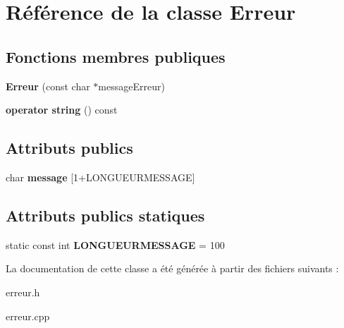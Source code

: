 \hypertarget{class_erreur}{\section{Référence de la classe Erreur}
\label{class_erreur}
}
\subsection*{Fonctions membres publiques}
\begin{DoxyCompactItemize}
\item 
\hypertarget{class_erreur_a15bbbbc7e23e4ea5e6bdebe8e299e6be}{{\bfseries Erreur} (const char $\ast$message\+Erreur)}\label{class_erreur_a15bbbbc7e23e4ea5e6bdebe8e299e6be}

\item 
\hypertarget{class_erreur_a69e752f84bce4f8565f02c484cc4d55e}{{\bfseries operator string} () const }\label{class_erreur_a69e752f84bce4f8565f02c484cc4d55e}

\end{DoxyCompactItemize}
\subsection*{Attributs publics}
\begin{DoxyCompactItemize}
\item 
\hypertarget{class_erreur_a55ae1259e86044a99bb4e78109ece875}{char {\bfseries message} \mbox{[}1+L\+O\+N\+G\+U\+E\+U\+R\+M\+E\+S\+S\+A\+G\+E\mbox{]}}\label{class_erreur_a55ae1259e86044a99bb4e78109ece875}

\end{DoxyCompactItemize}
\subsection*{Attributs publics statiques}
\begin{DoxyCompactItemize}
\item 
\hypertarget{class_erreur_a4bad7e055ecc19aa6c7616ddf51d05dd}{static const int {\bfseries L\+O\+N\+G\+U\+E\+U\+R\+M\+E\+S\+S\+A\+G\+E} = 100}\label{class_erreur_a4bad7e055ecc19aa6c7616ddf51d05dd}

\end{DoxyCompactItemize}


La documentation de cette classe a été générée à partir des fichiers suivants \+:\begin{DoxyCompactItemize}
\item 
erreur.\+h\item 
erreur.\+cpp\end{DoxyCompactItemize}
